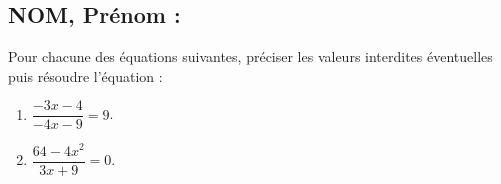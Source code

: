 \documentclass[a4paper,11pt,exos]{nsi}
\begin{document}
\subsection*{NOM, Prénom : \dotfill} 


\maketitle



\begin{exercice}
    Pour chacune des équations suivantes, préciser les valeurs interdites éventuelles puis résoudre l'équation :
    \begin{multicols}{3}
        \begin{enumerate}
            \item $\dfrac{-3x-4}{-4x-9}=9$.
	        \item $\dfrac{64-4x^2}{3x+9}=0$.
        \end{enumerate}
    \end{multicols}
    
\end{exercice}

\end{document}
